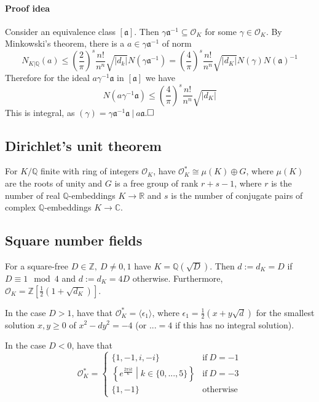 \documentclass{scrartcl}
\newcommand{\R}{\mathbb{R}}
\newcommand{\Z}{\mathbb{Z}}
\newcommand{\Q}{\mathbb{Q}}
\newcommand{\C}{\mathbb{C}}
\begin{document}
\paragraph{Proof idea} Consider an equivalence class $[\mathfrak{a}]$. Then $\gamma \mathfrak{a}^{-1} \subseteq \mathcal{O}_K$ for some $\gamma \in \mathcal{O}_K$.
By Minkowski's theorem, there is a $a \in \gamma\mathfrak{a}^{-1}$ of norm
\begin{equation*}
    N_{K|\Q}(a) \leq \left(\frac 2 \pi\right)^s \frac {n!} {n^n} \sqrt{|d_k|} N(\gamma\mathfrak{a}^{-1}) = \left(\frac 4 \pi\right)^s \frac {n!} {n^n} \sqrt{|d_K|} N(\gamma) N(\mathfrak{a})^{-1}
\end{equation*}
Therefore for the ideal $a\gamma^{-1}\mathfrak{a}$ in $[\mathfrak{a}]$ we have
\begin{equation*}
    N(a\gamma^{-1}\mathfrak{a}) \leq \left(\frac 4 \pi\right)^s \frac {n!} {n^n} \sqrt{|d_K|}
\end{equation*}
This is integral, as $(\gamma) = \gamma\mathfrak{a}^{-1}\mathfrak{a} \ | \ a\mathfrak{a}$.$\hfill\square$

\subsection{Dirichlet's unit theorem}
For $K / \Q$ finite with ring of integers $\mathcal{O}_K$, have $\mathcal{O}_K^* \cong \mu(K) \oplus G$, where $\mu(K)$ are the roots of unity and $G$ is a free group of rank $r + s - 1$, where $r$ is the number of real $\Q$-embeddings $K \to \R$ and $s$ is the number of conjugate pairs of complex $\Q$-embeddings $K \to \C$.

\subsection{Square number fields}
For a square-free $D \in \Z, \ D \neq 0, 1$ have $K = \Q(\sqrt{D})$. Then $d := d_K = D$ if $D \equiv 1 \mod 4$ and $d := d_K = 4D$ otherwise. Furthermore, $\mathcal{O}_K = \Z[\frac 1 2 (1 + \sqrt{d_K})]$.

In the case $D > 1$, have that $\mathcal{O}_K^* = \langle \epsilon_1 \rangle$, where $\epsilon_1 = \frac 1 2 (x + y \sqrt{d})$ for the smallest solution $x, y \geq 0$ of $x^2 - dy^2 = -4$ (or $... = 4$ if this has no integral solution).

In the case $D < 0$, have that 
\begin{equation}
    \mathcal{O}_K^* = \begin{cases}
        \{ 1, -1, i, -i \} & \text{if} \ D = -1 \\
        \left\{ e^{\frac {2\pi i k} 6} \middle| k \in \{0, ..., 5\} \right\} & \text{if} \ D = -3 \\
        \{ 1, -1 \} & \text{otherwise}
    \end{cases} \nonumber
\end{equation}
\end{document}
